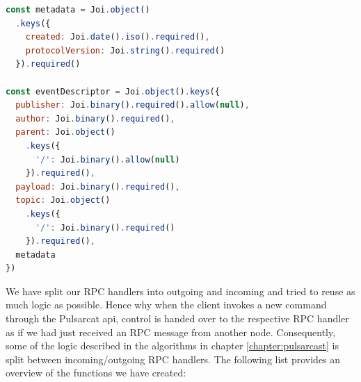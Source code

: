 \begin{lstlisting}[language=JavaScript, float=h, caption={Joi schema for and event descriptor},label={joi-schema-event-descriptor}]
const metadata = Joi.object()
  .keys({
    created: Joi.date().iso().required(),
    protocolVersion: Joi.string().required()
  }).required()

const eventDescriptor = Joi.object().keys({
  publisher: Joi.binary().required().allow(null),
  author: Joi.binary().required(),
  parent: Joi.object()
    .keys({
      '/': Joi.binary().allow(null)
    }).required(),
  payload: Joi.binary().required(),
  topic: Joi.object()
    .keys({
      '/': Joi.binary().required()
    }).required(),
  metadata
})
\end{lstlisting}

We have split our RPC handlers into outgoing and incoming and tried to reuse as
much logic as possible. Hence why when the client invokes a new command through
the Pulsarcat \acrshort{api}, control is handed over to the respective RPC handler as if
we had just received an RPC message from another node. Consequently, some of
the logic described in the algorithms in chapter \ref{chapter:pulsarcast} is
split between incoming/outgoing RPC handlers. The following list provides an
overview of the functions we have created:

